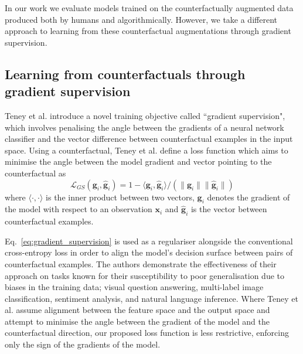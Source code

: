 \documentclass[sigconf,anonymous]{aamas}
\begin{document}
In our work we evaluate models trained on the counterfactually augmented data produced both by humans and algorithmically. However, we take a different approach to learning from these counterfactual augmentations through gradient supervision.

\subsection{Learning from counterfactuals through gradient supervision}
\label{subsec:gradient_supervision}
Teney et al. \cite{teney2020learning} introduce a novel training objective called ``gradient supervision", which involves penalising the angle between the gradients of a neural network classifier and the vector difference between counterfactual examples in the input space. Using a counterfactual, Teney et al. define a loss function which aims to minimise the angle between the model gradient and vector pointing to the counterfactual as 
\begin{equation}
        \mathcal{L}_{GS} \left(\mathbf{g}_i,\hat{\mathbf{g}}_i \right)  = 
        1 - \langle\mathbf{g}_i,\hat{\mathbf{g}}_i \rangle /
        \left( \lVert \mathbf{g}_i \rVert \lVert \hat{\mathbf{g}}_i \rVert \right)
        \label{eq:gradient_supervision}
\end{equation}
where $\langle \cdot, \cdot \rangle$ is the inner product between two vectors, $\mathbf{g}_i$ denotes the gradient of the model with respect to an observation $\mathbf{x}_i$ and $\hat{\mathbf{g}}_i$ is the vector between counterfactual examples.

Eq.~\ref{eq:gradient_supervision} is used as a regulariser alongside the conventional cross-entropy loss in order to align the model's decision surface between pairs of counterfactual examples. The authors demonstrate the effectiveness of their approach on tasks known for their susceptibility to poor generalisation due to biases in the training data; visual question answering, multi-label image classification, sentiment analysis, and natural language inference. Where Teney et al. assume alignment between the feature space and the output space and attempt to minimise the angle between the gradient of the model and the counterfactual direction, our proposed loss function is less restrictive, enforcing only the sign of the gradients of the model.
\end{document}
